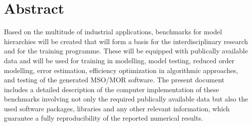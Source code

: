 \documentclass{ROMSOC}
\begin{document}

\section*{Abstract}
Based on the multitude of industrial applications, benchmarks for model hierarchies
will be created that will form a basis for the interdisciplinary research and for the training
programme. These will be equipped with publically available data and will be used for
training in modelling, model testing, reduced order modelling, error estimation, efficiency
optimization in algorithmic approaches, and testing of the generated MSO/MOR software. The present document includes a detailed description of the computer implementation of these benchmarks involving not only the required publically available data but also the used software packages, libraries and any other relevant information, which guarantee a fully reproducibility of the reported numerical results.
\vfill
\end{document}
